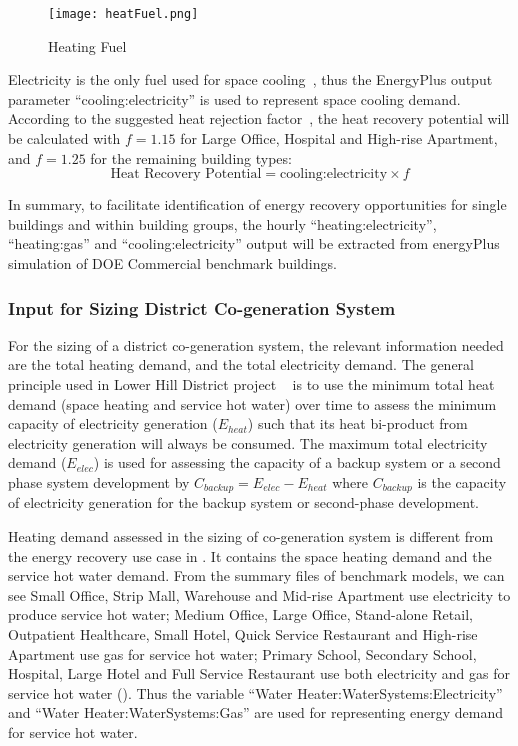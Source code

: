 \begin{figure}[h!]
  \centering
  \texttt{[image: heatFuel.png]}
  \caption[Heating Fuel]{Heating Fuel}
  \label{fig:heatFuel}
\end{figure}

Electricity is the only fuel used for space cooling~\cite{DOE2015},
thus the EnergyPlus output parameter ``cooling:electricity'' is used
to represent space cooling demand. According to the suggested heat
rejection factor~\cite{Bhatia2015}, the heat recovery potential will
be calculated with $f = 1.15$ for Large Office, Hospital and High-rise
Apartment, and $f = 1.25$ for the remaining building types:
\begin{equation}\label{eq:recover}
\text{Heat Recovery Potential} = \text{cooling:electricity} \times f
\end{equation}

In summary, to facilitate identification of energy recovery
opportunities for single buildings and within building groups, the
hourly ``heating:electricity'', ``heating:gas'' and
``cooling:electricity'' output will be extracted from energyPlus
simulation of DOE Commercial benchmark buildings.

\subsubsection{Input for Sizing District Co-generation
  System}
For the sizing of a district co-generation system, the relevant
information needed are the total heating demand, and the total
electricity demand. The general principle used in Lower Hill District
project ~\cite{baird2014} is to use the minimum total heat demand
(space heating and service hot water) over time to assess the minimum
capacity of electricity generation ($E_{heat}$) such that its heat
bi-product from electricity generation will always be consumed. The
maximum total electricity demand ($E_{elec}$) is used for assessing
the capacity of a backup system or a second phase system development
by $C_{backup} = E_{elec} - E_{heat}$ where $C_{backup}$ is the
capacity of electricity generation for the backup system or
second-phase development.

Heating demand assessed in the sizing of co-generation system is
different from the energy recovery use case in 
.  It contains the space heating demand and the service hot water
demand. From the summary files of benchmark models, we can see Small
Office, Strip Mall, Warehouse and Mid-rise Apartment use electricity
to produce service hot water; Medium Office, Large Office, Stand-alone
Retail, Outpatient Healthcare, Small Hotel, Quick Service Restaurant
and High-rise Apartment use gas for service hot water; Primary School,
Secondary School, Hospital, Large Hotel and Full Service Restaurant
use both electricity and gas for service hot water
(). Thus the variable ``Water
Heater:WaterSystems:Electricity'' and ``Water
Heater:WaterSystems:Gas'' are used for representing energy demand for
service hot water.


